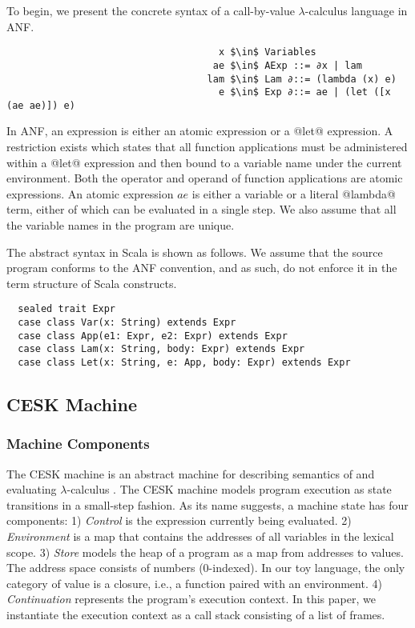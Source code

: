 \documentclass[acmsmall, review]{acmart}\settopmatter{}
\begin{document}
To begin, we present the concrete syntax of a call-by-value $\lambda$-calculus language
in ANF.

\begin{lstlisting}
                                     x $\in$ Variables
                                    ae $\in$ AExp ::= ∂x | lam
                                   lam $\in$ Lam ∂::= (lambda (x) e)
                                     e $\in$ Exp ∂::= ae | (let ([x (ae ae)]) e)
\end{lstlisting}

In ANF, an expression is either an atomic expression or a @let@ expression.
A restriction exists which states that all function applications must be administered
within a @let@ expression and then bound to a variable name under the current environment.
Both the operator and operand of function applications are atomic expressions.
An atomic expression $ae$ is either a variable or a literal @lambda@ term, either of which
can be evaluated in a single step. We also assume that all the variable names in the program
 are unique.

The abstract syntax in Scala is shown as follows. We assume that the source program conforms
to the ANF convention, and as such, do not enforce it in the term structure of Scala constructs.

\begin{lstlisting}
  sealed trait Expr
  case class Var(x: String) extends Expr
  case class App(e1: Expr, e2: Expr) extends Expr
  case class Lam(x: String, body: Expr) extends Expr
  case class Let(x: String, e: App, body: Expr) extends Expr
\end{lstlisting}

\subsection{CESK Machine} \label{cesk}

\subsubsection{Machine Components}

The CESK machine is an abstract machine for describing semantics of and evaluating
$\lambda$-calculus \cite{felleisen1987calculus}. The CESK machine models program execution
as state transitions in a small-step fashion. As its name suggests, a machine state has
four components:
1) \textit{Control} is the expression currently being evaluated.
2) \textit{Environment} is a map that contains the addresses of all variables in the lexical scope.
3) \textit{Store} models the heap of a program as a map from addresses to values.
  The address space consists of numbers (0-indexed).
  In our toy language, the only category of value is a closure, i.e., a function paired with
  an environment.
4) \textit{Continuation} represents the program's execution context. In this paper, we instantiate the 
execution context as a call stack consisting of a list of frames. 
\end{document}
